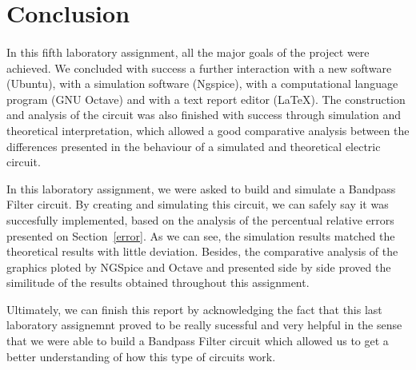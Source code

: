 \section{Conclusion}
\label{sec:conclusion}

\paragraph{}
In this fifth laboratory assignment, all the major goals of the project were achieved. We concluded with success a further interaction with a new software (Ubuntu), with a simulation software (Ngspice), with a computational language program (GNU Octave) and with a text report editor (LaTeX). The construction and analysis of the circuit was also finished with success through simulation and theoretical interpretation, which allowed a good comparative analysis between the differences presented in the behaviour of a simulated and theoretical electric circuit. 

In this laboratory assignment, we were asked to build and simulate a Bandpass Filter circuit. By creating and simulating this circuit, we can safely say it was succesfully implemented, based on the analysis of the percentual relative errors presented on Section~\ref{error}. As we can see, the simulation results matched the theoretical results with little deviation. Besides, the comparative analysis of the graphics ploted by NGSpice and Octave and presented side by side proved the similitude of the results obtained throughout this assignment. 

Ultimately, we can finish this report by acknowledging the fact that this last laboratory assignemnt proved to be really sucessful and very helpful in the sense that we were able to build a Bandpass Filter circuit which allowed us to get a better understanding of how this type of circuits work.

